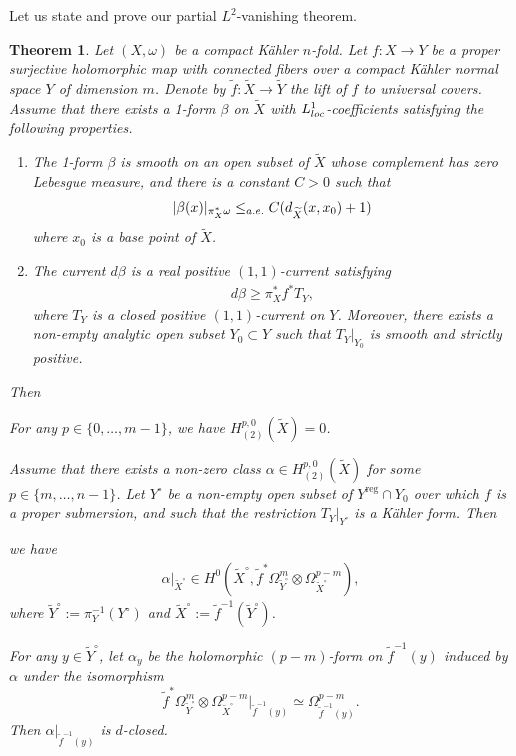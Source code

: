 \documentclass[11pt,a4paper,english]{smfart}
\theoremstyle{plain}
\newtheorem{theorem}{Theorem}[section]
\theoremstyle{definition}
\theoremstyle{plain}
\begin{document}
	Let us state and prove our partial  $L^2$-vanishing theorem. 
	\begin{theorem} \label{thm:vanishing2} 
 Let   $(X,\omega)$ be a compact 	 K\"ahler $n$-fold.  Let $f:X\to Y$ be a proper surjective holomorphic map with connected fibers over a compact  K\"ahler normal space $Y$ of dimension $m$. Denote by $\tilde{f}:\widetilde{X}\to \widetilde{Y}$ the lift of $f$ to  universal covers.   Assume that  there exists   a  1-form  $\beta$ on $\widetilde{X}$  with $L_{\rm loc}^1$-coefficients  satisfying the following properties. 
 	\begin{enumerate}[label*=(\rm \alph*)]
 	\item \label{item:smooth} The 1-form $\beta$ is smooth  on an open subset   of $\widetilde{X}$ whose complement has zero Lebesgue measure, and  there is a constant $C>0$ such that  \begin{align}\label{item:dlinear}
 	 |\beta(x)|_{\pi_X^*\omega}\leq_{\rm a.e.} C(d_{\widetilde{X}}(x,x_0)+1)
 \end{align}
 where $x_0$ is a base point of $\widetilde{X}$. 
 	\item\label{item:bounded}   The current \( d\beta \) is a real positive \( (1,1) \)-current satisfying
 	\begin{align}\label{eq:mutual}
 		d\beta \geq \pi_X^* f^* T_Y,
 	\end{align}
 	where \( T_Y \) is a closed positive \( (1,1) \)-current on \( Y \). Moreover, there exists a non-empty analytic open subset \( Y_0\subset Y \) such that \( T_Y|_{Y_0} \) is smooth and strictly positive.
 \end{enumerate} 
 Then  \begin{thmlist}
 	 \item\label{item:partial}  For any $p\in \{0,\ldots,m-1\}$, we have  $H^{p,0}_{(2)}(\widetilde{X})=0$. 
 	\end{thmlist}
Assume that there exists a non-zero class $\alpha \in H^{p,0}_{(2)}(\widetilde{X})$ for some $p\in \{m,\ldots,n-1\}$. Let $Y^\circ$ be a non-empty open subset of $Y^{\mathrm{reg}} \cap Y_0$ over which $f$ is a proper submersion, and such that the restriction $T_Y|_{Y^\circ}$ is a K\"ahler form.  Then
 	\begin{thmlist} [resume]
 	 \item\label{item:long}  we have   \begin{align}\label{eq:tensor}
 	 	 \alpha|_{\widetilde{X}^\circ}\in H^0(\widetilde{X}^\circ, \tilde{f}^*\Omega_{\widetilde{Y}^\circ}^{m}\otimes \Omega_{\widetilde{X}^\circ}^{p-m}), 
 	 \end{align}
where $\widetilde{Y}^\circ:= \pi_Y^{-1}(Y^\circ)$ and $\widetilde{X}^\circ:=\tilde{f}^{-1}(\widetilde{Y}^\circ)$.
\item \label{item:d-closed} For any $y\in \widetilde{Y}^\circ$,  let $\alpha_y$ be the holomorphic $(p-m)$-form on $\tilde{f}^{-1}(y)$ induced by $\alpha$   under the isomorphism $$\tilde{f}^*\Omega_{\widetilde{Y}^\circ}^{m}\otimes \Omega_{\widetilde{X}^\circ}^{p-m}|_{\tilde{f}^{-1}(y)}\simeq \Omega_{\tilde{f}^{-1}(y)}^{p-m}.$$ 
 	Then  $
 	 \alpha|_{\tilde{f}^{-1}(y)}
 	 $ is   $d$-closed.
 \end{thmlist}
	
	\end{theorem}
\end{document}
